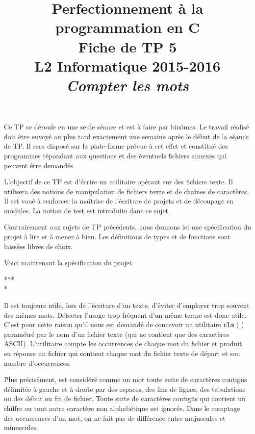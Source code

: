 \documentclass[12pt]{article}
\date{}
\title{{\bf Perfectionnement à la programmation en {\sf C}} \\
    Fiche de TP 5 \\
    {\small L2 Informatique 2015-2016} \\
    {\it \small Compter les mots}}
\theoremstyle{definition}
\begin{document}
 

\maketitle

Ce TP se déroule en une seule séance et est à faire par binômes.
Le travail réalisé doit être envoyé au plus tard exactement une
semaine après le début de la séance de TP. Il sera disposé sur
la plate-forme prévue à cet effet et constitué des programmes
répondant aux questions et des éventuels fichiers annexes qui
peuvent être demandés.
\bigskip
\bigskip

L'objectif de ce TP est d'écrire un utilitaire opérant sur des fichiers
texte. Il utilisera des notions de manipulation de fichiers texte et de 
chaînes de caractères. Il est voué à renforcer la maîtrise de 
l'écriture de projets et de découpage en modules. La notion de test est 
introduite dans ce sujet.
\bigskip

Contrairement aux sujets de TP précédents, nous donnons ici une 
spécification du projet à lire et à mener à bien. Les définitions de types et de 
fonctions sont laissées libres de choix.
\bigskip

Voici maintenant la spécification du projet.
\bigskip

\begin{center} *** \\ * \end{center}

Il est toujours utile, lors de l'écriture d'un texte, d'éviter d'employer
trop souvent des mêmes mots. Détecter l'usage trop fréquent d'un même 
terme est donc utile. C'est pour cette raison qu'il nous est demandé de 
concevoir un utilitaire {\tt clm} ( \fg)
paramétré par le nom d'un fichier texte (qui ne contient que des 
caractères ASCII). L'utilitaire compte les occurrences de chaque mot
du fichier et produit en réponse un fichier qui contient chaque
mot du fichier texte de départ et son nombre d'occurrences.
\medskip

Plus précisément, est considéré comme un mot toute suite de caractères
contigüs délimitée à gauche et à droite par des espaces, des fins de lignes,
des tabulations ou des début ou fin de fichier. Toute suite de caractères
contigüs qui contient un chiffre ou tout autre caractère non alphabétique 
est ignorée. Dans le comptage des occurrences d'un mot, on ne fait pas de
différence entre majuscules et minuscules. 
\medskip
\end{document}
